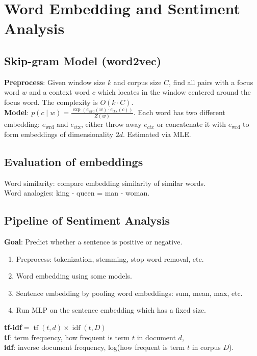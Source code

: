 \section{Word Embedding and Sentiment Analysis}

\subsection*{Skip-gram Model (word2vec)}
\textbf{Preprocess}: Given window size $k$ and corpus size $C$, find all pairs with a focus word $w$ and a context word $c$ which locates in the window centered around the focus word. The complexity is $O(k\cdot C)$.\\
\textbf{Model}: $p(c\mid w)=\frac{\exp(e_{\text{wrd}}(w)\cdot e_{\text{ctx}}(c))}{Z(w)}$. Each word has two different embedding: $e_{\text{wrd}}$ and $e_{\text{ctx}}$, either throw away $e_{ctx}$ or concatenate it with $e_{\text{wrd}}$ to form embeddings of dimensionality $2d$. Estimated via MLE.

\subsection*{Evaluation of embeddings}
Word similarity: compare embedding similarity of similar words. \\
Word analogies: king - queen = man - woman.

\subsection*{Pipeline of Sentiment Analysis}
\textbf{Goal}: Predict whether a sentence is positive or negative.
\begin{enumerate}
    \item Preprocess: tokenization, stemming, stop word removal, etc.
    \item Word embedding using some models.
    \item Sentence embedding by pooling word embeddings: sum, mean, max, etc.
    \item Run MLP on the sentence embedding which has a fixed size.
\end{enumerate}

\textbf{tf-idf}$=\operatorname{tf}(t, d) \times \operatorname{idf}(t, D)$ \\
\textbf{tf}: term frequency, how frequent is term $t$ in document $d$, \\ 
\textbf{idf}: inverse document frequency, log(how frequent is term $t$ in corpus $D$).
